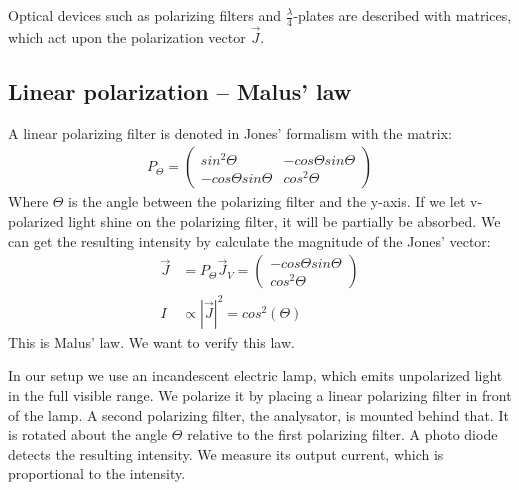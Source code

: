 \documentclass[a4paper,10pt,twocolumn]{article}
\newcommand{\quaterWavePlates}{$\frac{\lambda}{4}$-plates }
\begin{document}
    Optical devices such as polarizing filters and \quaterWavePlates are described with matrices, which act
    upon the polarization vector $\vec{J}$. 
    
    \subsection{Linear polarization -- Malus' law}
    \label{subsec:MalusLaw}
    
    
    A linear polarizing filter is denoted in Jones' formalism with the matrix:
    \begin{align*}
        P_{\Theta} = \begin{pmatrix} sin^2\Theta & - cos\Theta sin\Theta \\
                        - cos\Theta sin\Theta & cos^2\Theta \end{pmatrix}
    \end{align*}
    Where $\Theta$ is the angle between the polarizing filter and the y-axis.
    If we let v-polarized light shine on the polarizing filter, it will be partially be absorbed.
    We can get the resulting intensity by calculate the magnitude of the Jones' vector:
    \begin{align}
        \label{eq:theoMaluslaw}
        \vec{J} &= P_{\Theta} \vec{J}_V = \begin{pmatrix} -cos\Theta sin\Theta \\
                                               cos^2\Theta\end{pmatrix} \\
        I &\propto | \vec{J} |^2 = cos^2(\Theta) 
    \end{align}
    This is Malus' law.
    We want to verify this law.
    
    In our setup we use an incandescent electric lamp, which emits unpolarized light in the full
    visible range.
    We polarize it by placing a linear polarizing filter in front of the lamp.
    A second polarizing filter, the analysator, is mounted behind that.
    It is rotated about the angle $\Theta$ relative to the first polarizing filter.
    A photo diode detects the resulting intensity.
    We measure its output current, which is proportional to the intensity.
    
\end{document}
